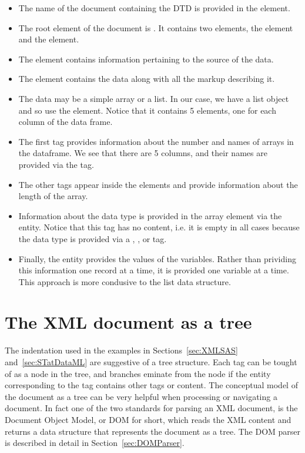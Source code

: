 \begin{itemize}
\item The name of the document containing the DTD is provided in
the  element.
\item The root element of the document is .
It contains two elements, the 
 element and the  element.
\item The  element contains information pertaining
to the source of the data. 
\item The  element contains the data along with
all the markup describing it.
\item The data may be a simple array or a list. In our case, we have
a list object and so use the  element. Notice that
it contains 5  elements, one for each column of the 
data frame.
\item The first  tag provides information about
the number and names of arrays in the dataframe. We see that there
are 5 columns, and their names are provided via the  tag.
\item The other  tags appear inside the 
 elements and provide information about the length
of the array. 
\item Information about the data type is provided in the array
element via the  entity.
Notice that this tag has no content, i.e. it is empty in all cases
because the data type is provided via a ,
, or  tag.
\item Finally, the  entity provides the values of the
variables. Rather than prividing this information one record at a
time, it is provided one variable at a time. This approach is 
more condusive to the list data structure.
\end{itemize}

\section{The XML document as a tree}
The indentation used in the examples in Sections~\ref{sec:XMLSAS} 
and~\ref{sec:STatDataML} are suggestive of a tree structure.
Each tag can be tought of as a node in the tree, and branches
eminate from the node if the entity corresponding to the tag
contains other tags or content.
The conceptual model of the document as a tree can be very
helpful when processing or navigating a document.
In fact one of the two standards for parsing an XML document, 
is the Document Object Model, or DOM for short, which
reads the XML content and returns a data structure that
represents the document as a tree. The DOM parser is described 
in detail in Section~\ref{sec:DOMParser}. 

